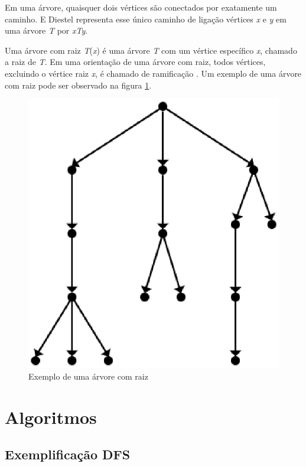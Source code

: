 \begin{apendicesenv}
Em uma árvore, quaisquer dois vértices são conectados por exatamente um caminho. E Diestel \cite{Diestel:1997} representa esse único caminho de ligação vértices \textit{x} e \textit{y} em uma árvore \textit{T} por \textit{xTy}.

Uma árvore com raiz \textit{T}(\textit{x}) é uma árvore \textit{T} com um vértice específico \textit{x}, chamado a raiz de \textit{T}. Em uma orientação de uma árvore com raiz, todos vértices, excluindo o vértice raiz \textit{x}, é chamado de ramificação \cite{Bondy:2007}. Um exemplo de uma árvore com raiz pode ser observado na figura \ref{arvore_raiz}.

\begin{figure}[!h]
	\centering
	\includegraphics[scale=0.2]{figuras/capitulo2/arvore_raiz.eps}
	\caption[Exemplo de uma árvore com raiz]{Exemplo de uma árvore com raiz \cite{Bondy:2007}}
	\label{arvore_raiz}
\end{figure}

\chapter{Algoritmos}

\section{Exemplificação DFS}
\label{sec:exemplificacao dfs}


\end{apendicesenv}
